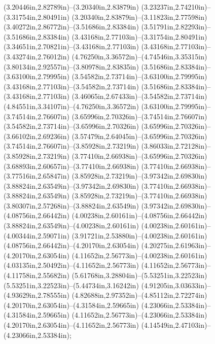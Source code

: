 (3.20446in,2.82789in)--(3.20340in,2.83879in) (3.23237in,2.74210in)--(3.31754in,2.80491in) (3.20340in,2.83879in)--(3.11823in,2.77598in) (3.40272in,2.86772in)--(3.51686in,2.83384in) (3.51791in,2.82293in)--(3.51686in,2.83384in) (3.43168in,2.77103in)--(3.31754in,2.80491in) (3.34651in,2.70821in)--(3.43168in,2.77103in) (3.43168in,2.77103in)--(3.43274in,2.76012in) (4.76250in,3.36572in)--(4.74546in,3.35315in) (3.80134in,2.92557in)--(3.80978in,2.83835in) (3.51686in,2.83384in)--(3.63100in,2.79995in) (3.54582in,2.73714in)--(3.63100in,2.79995in) (3.43168in,2.77103in)--(3.54582in,2.73714in) (3.51686in,2.83384in)--(3.43168in,2.77103in) (3.46065in,2.67433in)--(3.54582in,2.73714in) (4.84551in,3.34107in)--(4.76250in,3.36572in) (3.63100in,2.79995in)--(3.74514in,2.76607in) (3.65996in,2.70326in)--(3.74514in,2.76607in) (3.54582in,2.73714in)--(3.65996in,2.70326in) (3.65996in,2.70326in)--(3.66102in,2.69236in) (3.57479in,2.64045in)--(3.65996in,2.70326in) (3.74514in,2.76607in)--(3.85928in,2.73219in) (3.86033in,2.72128in)--(3.85928in,2.73219in) (3.77410in,2.66938in)--(3.65996in,2.70326in) (3.68893in,2.60657in)--(3.77410in,2.66938in) (3.77410in,2.66938in)--(3.77516in,2.65847in) (3.85928in,2.73219in)--(3.97342in,2.69830in) (3.88824in,2.63549in)--(3.97342in,2.69830in) (3.77410in,2.66938in)--(3.88824in,2.63549in) (3.85928in,2.73219in)--(3.77410in,2.66938in) (3.80307in,2.57268in)--(3.88824in,2.63549in) (3.97342in,2.69830in)--(4.08756in,2.66442in) (4.00238in,2.60161in)--(4.08756in,2.66442in) (3.88824in,2.63549in)--(4.00238in,2.60161in) (4.00238in,2.60161in)--(4.00344in,2.59071in) (3.91721in,2.53880in)--(4.00238in,2.60161in) (4.08756in,2.66442in)--(4.20170in,2.63054in) (4.20275in,2.61963in)--(4.20170in,2.63054in) (4.11652in,2.56773in)--(4.00238in,2.60161in) (4.03135in,2.50492in)--(4.11652in,2.56773in) (4.11652in,2.56773in)--(4.11758in,2.55682in) (5.61768in,3.28804in)--(5.53251in,3.22523in) (5.53251in,3.22523in)--(5.44734in,3.16242in) (4.91205in,3.03633in)--(4.93629in,2.78555in) (4.82688in,2.97352in)--(4.85112in,2.72274in) (4.20170in,2.63054in)--(4.31584in,2.59665in) (4.23066in,2.53384in)--(4.31584in,2.59665in) (4.11652in,2.56773in)--(4.23066in,2.53384in) (4.20170in,2.63054in)--(4.11652in,2.56773in) (4.14549in,2.47103in)--(4.23066in,2.53384in);

